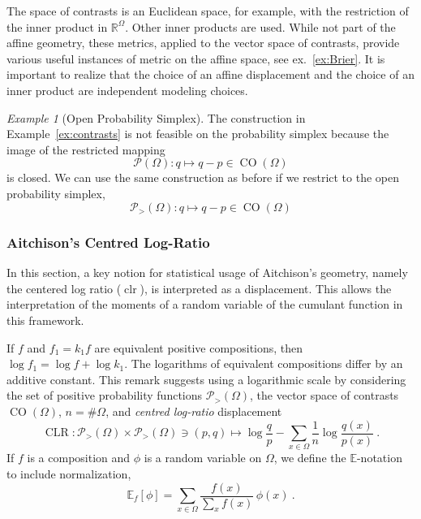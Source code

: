 \documentclass[axioms,article,submit,pdftex,moreauthors]{Definitions/mdpi}
\theoremstyle{plain}
\theoremstyle{remark}
\newtheorem{myexample}{Example}
\newcommand{\CLR}{\operatorname{CLR}}
\newcommand{\clr}{\operatorname{clr}}
\newcommand{\Expectation}{\mathbb E}
\newcommand{\contrastson}[1]{\operatorname{CO}\left(#1\right)}
\newcommand{\densitieson}[1]{\mathcal P\left(#1\right)}
\newcommand{\expectat}[2]{\Expectation_{#1}\left[#2\right]}
\newcommand{\pdensitieson}[1]{\mathcal P_{>}\left(#1\right)}
\newcommand{\reals}{\mathbb{R}}
\begin{document}
The space of contrasts is an Euclidean space, for example, with the restriction of the inner product in $\reals^\Omega$. Other inner products are used.  While not part of the affine geometry, these metrics, applied to the vector space of contrasts, provide various useful instances of metric on the affine space, see ex.~\ref{ex:Brier}. It is important to realize that the choice of an affine displacement and the choice of an inner product are independent modeling choices.

\begin{myexample}[Open Probability Simplex] \label{ex:A}
The construction in Example~\ref{ex:contrasts} is not feasible on the probability simplex because the image of the restricted mapping
\begin{equation*}
    \densitieson\Omega \colon q \mapsto q - p \in \contrastson\Omega
\end{equation*}
is closed. We can use the same construction as before if we restrict to the open probability simplex,
\begin{equation}
    \pdensitieson\Omega \colon q \mapsto q - p \in \contrastson\Omega
\end{equation} 
\end{myexample}

\subsubsection{Aitchison's Centred Log-Ratio \cite{aitchison:1986}}
\label{sec:aitchison-clr}
In this section, a key notion for statistical usage of Aitchison's geometry, namely the centered log ratio ($\clr$), is interpreted as a displacement. This allows the interpretation of the moments of a random variable of the cumulant function in this framework. 

If $f$ and $f_1 = k_1 f$ are equivalent positive compositions, then $\log f_1 = \log f + \log k_1$. The logarithms of equivalent compositions differ by an additive constant. This remark suggests using a logarithmic scale by considering the set of positive probability functions $\pdensitieson\Omega$, the vector space of contrasts $\contrastson\Omega$, $n = \#\Omega$, and \emph{centred log-ratio} displacement
\begin{equation}\label{eq:CLR}
\CLR \colon \pdensitieson\Omega \times \pdensitieson\Omega \ni (p,q) \mapsto \log \frac q p - \sum_{x \in \Omega} \frac 1{n} \log \frac{q(x)}{p(x)} \ .
\end{equation}
If $f$ is a composition and $\phi$ is a random variable on $\Omega$, we define the $\Expectation$-notation to include normalization, 
\begin{equation}
    \expectat f \phi = \sum_{x \in \Omega} \frac{f(x)}{\sum_x f(x)} \, \phi(x) \ .
\end{equation}
\end{document}
